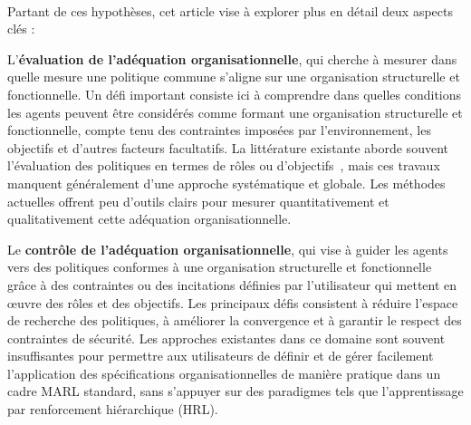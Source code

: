 \

Partant de ces hypothèses, cet article vise à explorer plus en détail deux aspects clés :
\begin{enumerate*}[label={\roman*) },itemjoin={; \quad}]
    \item L'\textbf{évaluation de l'adéquation organisationnelle}, qui cherche à mesurer dans quelle mesure une politique commune s'aligne sur une organisation structurelle et fonctionnelle. Un défi important consiste ici à comprendre dans quelles conditions les agents peuvent être considérés comme formant une organisation structurelle et fonctionnelle, compte tenu des contraintes imposées par l'environnement, les objectifs et d'autres facteurs facultatifs.
    La littérature existante aborde souvent l'évaluation des politiques en termes de rôles ou d'objectifs~\cite{Isakov2024, Wen2024, Xie2024}, mais ces travaux manquent généralement d'une approche systématique et globale. Les méthodes actuelles offrent peu d'outils clairs pour mesurer quantitativement et qualitativement cette adéquation organisationnelle.
    \item Le \textbf{contrôle de l'adéquation organisationnelle}, qui vise à guider les agents vers des politiques conformes à une organisation structurelle et fonctionnelle grâce à des contraintes ou des incitations définies par l'utilisateur qui mettent en œuvre des rôles et des objectifs.
    Les principaux défis consistent à réduire l'espace de recherche des politiques, à améliorer la convergence et à garantir le respect des contraintes de sécurité.
    Les approches existantes dans ce domaine sont souvent insuffisantes pour permettre aux utilisateurs de définir et de gérer facilement l'application des spécifications organisationnelles de manière pratique dans un cadre MARL standard, sans s'appuyer sur des paradigmes tels que l'apprentissage par renforcement hiérarchique (HRL).
\end{enumerate*}

\

